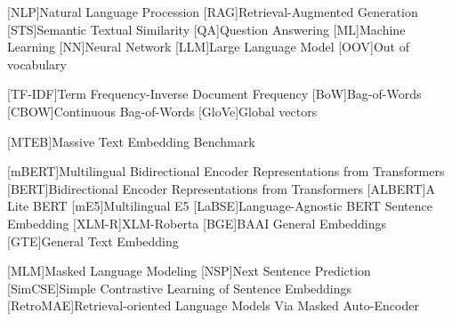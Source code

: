 
\begin{acronym}
  [NLP]{Natural Language Procession}
  [RAG]{Retrieval-Augmented Generation}
  [STS]{Semantic Textual Similarity}
  [QA]{Question Answering}
  [ML]{Machine Learning}
  [NN]{Neural Network}
  [LLM]{Large Language Model}
  [OOV]{Out of vocabulary}

  [TF-IDF]{Term Frequency-Inverse Document Frequency}
  [BoW]{Bag-of-Words}
  [CBOW]{Continuous Bag-of-Words}
  [GloVe]{Global vectors}
  
  [MTEB]{Massive Text Embedding Benchmark}
  
  [mBERT]{Multilingual Bidirectional Encoder Representations from Transformers}
  [BERT]{Bidirectional Encoder Representations from Transformers}
  [ALBERT]{A Lite BERT}
  [mE5]{Multilingual E5}
  [LaBSE]{Language-Agnostic BERT Sentence Embedding}
  [XLM-R]{XLM-Roberta}
  [BGE]{BAAI General Embeddings}
  [GTE]{General Text Embedding}  

  [MLM]{Masked Language Modeling}
  [NSP]{Next Sentence Prediction}
  [SimCSE]{Simple Contrastive Learning of Sentence Embeddings}
  [RetroMAE]{Retrieval-oriented Language Models Via Masked Auto-Encoder}
\end{acronym}
